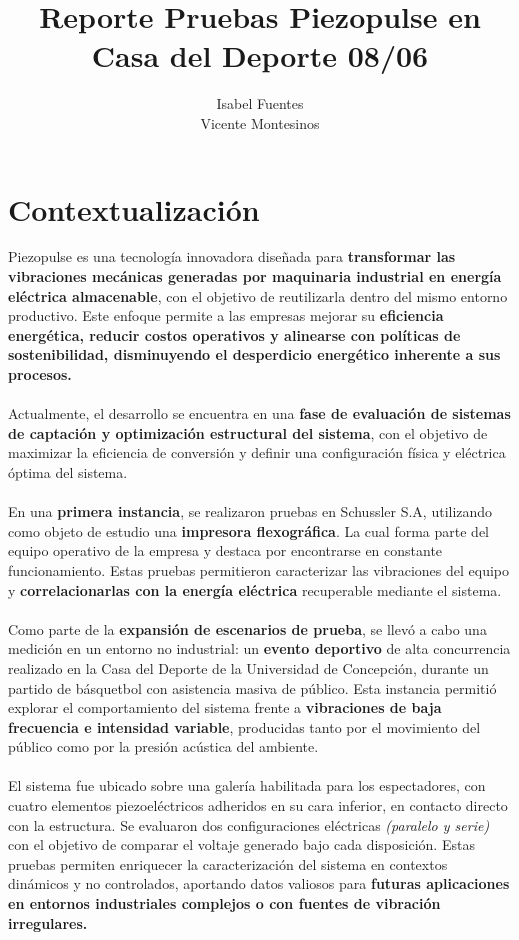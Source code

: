 \documentclass{article}
\title{Reporte Pruebas Piezopulse en Casa del Deporte 08/06}
\author{Isabel Fuentes \\ Vicente Montesinos}
\begin{document}
\maketitle


\tableofcontents
\newpage
\section{Contextualización}
Piezopulse es una tecnología innovadora diseñada para \textbf{transformar las vibraciones mecánicas generadas por maquinaria industrial en energía eléctrica almacenable}, con el objetivo de reutilizarla dentro del mismo entorno productivo. Este enfoque permite a las empresas mejorar su \textbf{eficiencia energética, reducir costos operativos y alinearse con políticas de sostenibilidad, disminuyendo el desperdicio energético inherente a sus procesos.}\\
\\
Actualmente, el desarrollo se encuentra en una \textbf{fase de evaluación de sistemas de captación y optimización estructural del sistema}, con el objetivo de maximizar la eficiencia de conversión y definir una configuración física  y eléctrica óptima del sistema.
\\
\\
En una \textbf{primera instancia}, se realizaron pruebas en Schussler S.A\cite{PrimeraPrueba}, utilizando como objeto de estudio una \textbf{impresora flexográfica}. La cual forma parte del equipo operativo de la empresa y destaca por encontrarse en constante funcionamiento. Estas pruebas permitieron caracterizar las vibraciones del equipo y \textbf{correlacionarlas con la energía eléctrica} recuperable mediante el sistema. 
\\
\\
Como parte de la \textbf{expansión de escenarios de prueba}, se llevó a cabo una medición en un entorno no industrial: un \textbf{evento deportivo} de alta concurrencia realizado en la Casa del Deporte de la Universidad de Concepción, durante un partido de básquetbol con asistencia masiva de público. Esta instancia permitió explorar el comportamiento del sistema frente a \textbf{vibraciones de baja frecuencia e intensidad variable}, producidas tanto por el movimiento del público como por la presión acústica del ambiente.
\\
\\
El sistema fue ubicado sobre una galería habilitada para los espectadores, con cuatro elementos piezoeléctricos adheridos en su cara inferior, en contacto directo con la estructura. Se evaluaron dos configuraciones eléctricas \textit{(paralelo y serie)} con el objetivo de comparar el voltaje generado bajo cada disposición. Estas pruebas permiten enriquecer la caracterización del sistema en contextos dinámicos y no controlados, aportando datos valiosos para \textbf{futuras aplicaciones en entornos industriales complejos o con fuentes de vibración irregulares.}
\end{document}
